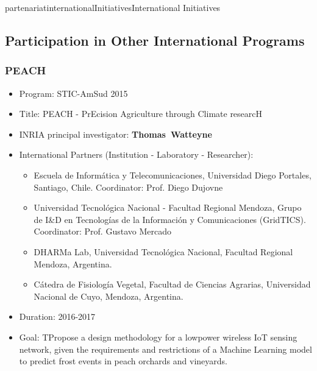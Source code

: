 \documentclass{ra2016}
\newcommand{\thomas}           {\textbf{Thomas~Watteyne}}
\begin{document}
\begin{module}{partenariat}{internationalInitiatives}{International Initiatives}
\subsection{Participation in Other International Programs}


\subsubsection{PEACH}

\begin{itemize}
    \item Program: STIC-AmSud 2015
    \item Title: PEACH - PrEcision Agriculture through Climate researcH
    \item INRIA principal investigator: \thomas
    \item International Partners (Institution -  Laboratory - Researcher):
        \begin{itemize}
            \item Escuela de Inform\'atica y Telecomunicaciones, Universidad Diego Portales, Santiago, Chile. Coordinator: Prof. Diego Dujovne
            \item Universidad Tecnol\'ogica Nacional - Facultad Regional Mendoza, Grupo de I\&D en Tecnologías de la Información y Comunicaciones (GridTICS). Coordinator: Prof. Gustavo Mercado
            \item DHARMa Lab, Universidad Tecnol\'ogica Nacional, Facultad Regional Mendoza, Argentina.
            \item C\'atedra de Fisiolog\'ia Vegetal, Facultad de Ciencias Agrarias, Universidad Nacional de Cuyo, Mendoza, Argentina.
        \end{itemize}
    \item Duration: 2016-2017
    \item Goal: TPropose a design methodology for a low­power wireless IoT sensing network, given the requirements and restrictions of a Machine Learning model to predict frost events in peach orchards and vineyards.
\end{itemize}


\end{module}
\end{document}
